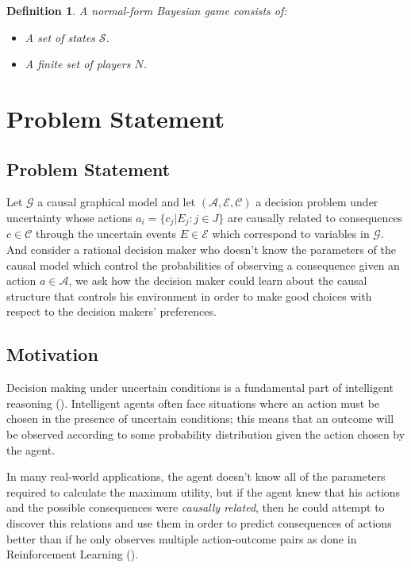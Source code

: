 \documentclass[11pt]{article}
\theoremstyle{plain}
\newtheorem{defi}[teo]{Definition}
\begin{document}
\begin{defi}
A normal-form Bayesian game consists of:
\begin{itemize}
\item A set of states $\mathcal{S}$.
\item A finite set of players $N$.
\end{itemize}
\end{defi}



\section{Problem Statement}
	\subsection{Problem Statement}
	Let  $\mathcal{G}$ a causal graphical model and let $(\mathcal{A},\mathcal{E},\mathcal{C})$ a decision problem under uncertainty whose actions $a_i = \{ c_j | E_j : j \in J \}$  are causally related to consequences $c \in \mathcal{C}$ through the uncertain events $E \in \mathcal{E}$ which correspond to variables in $\mathcal{G}$. And consider a rational decision maker who doesn't know the parameters of the causal model which control the probabilities of observing a consequence given an action $a \in \mathcal{A}$, we ask how the decision maker could learn about the causal structure that controls his environment in order to make good choices with respect to the decision makers' preferences.
	\subsection{Motivation}
	Decision making under uncertain conditions is a fundamental part of intelligent reasoning (\cite{lake2017building}). Intelligent agents often face situations where an action must be chosen in the presence of uncertain conditions; this means that an outcome will be observed according to some probability distribution given the action chosen by the agent.
	
	In many real-world applications, the agent doesn't know all of the parameters required to calculate the maximum utility, but if the agent knew that his actions and the possible consequences were \textit{causally related}, then he could attempt to discover this relations and use them in order to predict consequences of actions better than if he only observes multiple action-outcome pairs as done in Reinforcement Learning (\cite{sutton1998reinforcement}). 
	
\end{document}
